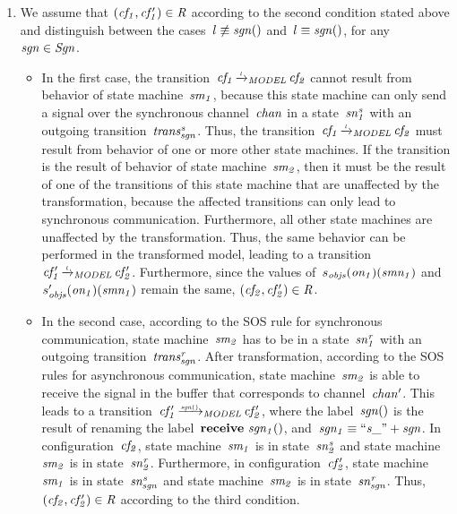 \begin{enumerate}
\item
We assume that $(\it{cf_1}, \it{cf_1'})\in R$ according to the second condition stated above and distinguish between the cases~$l \not \equiv \it{sgn}()$ and~$l \equiv \it{sgn}()$, for any~$\it{sgn} \in \it{Sgn}$.
\begin{itemize}
\item
In the first case, the transition~$\it{cf_1} \TextModelRelation{l} \it{cf_2}$ cannot result from behavior of state machine~$\it{sm_1}$, because this state machine can only send a signal over the synchronous channel~$\it{chan}$ in a state~$\it{sn^s_1}$ with an outgoing transition~$\it{trans^s_{sgn}}$.
Thus, the transition~$\it{cf_1} \TextModelRelation{l} \it{cf_2}$ must result from behavior of one or more other state machines.
If the transition is the result of behavior of state machine~$\it{sm_2}$, then it must be the result of one of the transitions of this state machine that are unaffected by the transformation, because the affected transitions can only lead to synchronous communication.
Furthermore, all other state machines are unaffected by the transformation.
Thus, the same behavior can be performed in the transformed model, leading to a transition~$\it{cf'_1} \TextModelRelation{l} \it{cf'_2}$.
Furthermore, since the values of~$s_{\it{objs}}(\it{on_1})(\it{smn_1})$ and~$s_{\it{objs}}'(\it{on_1})(\it{smn_1})$ remain the same, $(\it{cf_2}, \it{cf_2'})\in R$.
\item
In the second case, according to the SOS rule for synchronous communication, state machine~$\it{sm_2}$ has to be in a state~$\it{sn^r_1}$ with an outgoing transition~$\it{trans^r_{sgn}}$.
After transformation, according to the SOS rules for asynchronous communication, state machine~$\it{sm_2}$ is able to receive the signal in the buffer that corresponds to channel~$\it{chan'}$.
This leads to a transition~$\it{cf'_1} \TextModelRelation{\it{sgn}()} \it{cf'_2}$,
where the label~$\it{sgn}()$ is the result of renaming the label~$\textbf{receive}\ \it{sgn_1}()$, and~$\it{sgn_1} \equiv ``s\_" + \it{sgn}$.
In configuration~$\it{cf_2}$, state machine~$\it{sm_1}$ is in state~$\it{sn^s_2}$ and state machine~$\it{sm_2}$ is in state~$\it{sn^r_2}$.
Furthermore, in configuration~$\it{cf'_2}$, state machine~$\it{sm_1}$ is in state~$\it{sn^s_{sgn}}$ and state machine~$\it{sm_2}$ is in state~$\it{sn^r_{sgn}}$.
Thus, $(\it{cf_2}, \it{cf_2'})\in R$ according to the third condition.
\end{itemize}


\end{enumerate}
